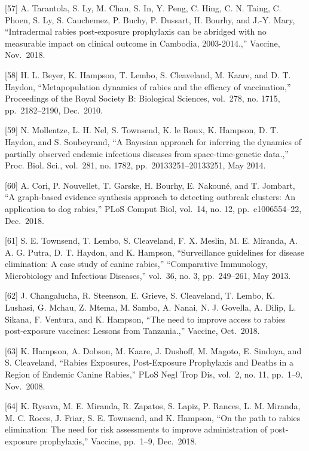 \documentclass[
]{book}
\begin{document}
{[}57{]} A. Tarantola, S. Ly, M. Chan, S. In, Y. Peng, C. Hing, C. N. Taing, C. Phoen, S. Ly, S. Cauchemez, P. Buchy, P. Dussart, H. Bourhy, and J.-Y. Mary, ``Intradermal rabies post-exposure prophylaxis can be abridged with no measurable impact on clinical outcome in Cambodia, 2003-2014.,'' Vaccine, Nov.~2018.

{[}58{]} H. L. Beyer, K. Hampson, T. Lembo, S. Cleaveland, M. Kaare, and D. T. Haydon, ``Metapopulation dynamics of rabies and the efficacy of vaccination,'' Proceedings of the Royal Society B: Biological Sciences, vol.~278, no. 1715, pp.~2182--2190, Dec.~2010.

{[}59{]} N. Mollentze, L. H. Nel, S. Townsend, K. le Roux, K. Hampson, D. T. Haydon, and S. Soubeyrand, ``A Bayesian approach for inferring the dynamics of partially observed endemic infectious diseases from space-time-genetic data.,'' Proc. Biol. Sci., vol.~281, no. 1782, pp.~20133251--20133251, May 2014.

{[}60{]} A. Cori, P. Nouvellet, T. Garske, H. Bourhy, E. Nakouné, and T. Jombart, ``A graph-based evidence synthesis approach to detecting outbreak clusters: An application to dog rabies,'' PLoS Comput Biol, vol.~14, no. 12, pp.~e1006554--22, Dec.~2018.

{[}61{]} S. E. Townsend, T. Lembo, S. Cleaveland, F. X. Meslin, M. E. Miranda, A. A. G. Putra, D. T. Haydon, and K. Hampson, ``Surveillance guidelines for disease elimination: A case study of canine rabies,'' ``Comparative Immunology, Microbiology and Infectious Diseases,'' vol.~36, no. 3, pp.~249--261, May 2013.

{[}62{]} J. Changalucha, R. Steenson, E. Grieve, S. Cleaveland, T. Lembo, K. Lushasi, G. Mchau, Z. Mtema, M. Sambo, A. Nanai, N. J. Govella, A. Dilip, L. Sikana, F. Ventura, and K. Hampson, ``The need to improve access to rabies post-exposure vaccines: Lessons from Tanzania.,'' Vaccine, Oct.~2018.

{[}63{]} K. Hampson, A. Dobson, M. Kaare, J. Dushoff, M. Magoto, E. Sindoya, and S. Cleaveland, ``Rabies Exposures, Post-Exposure Prophylaxis and Deaths in a Region of Endemic Canine Rabies,'' PLoS Negl Trop Dis, vol.~2, no. 11, pp.~1--9, Nov.~2008.

{[}64{]} K. Rysava, M. E. Miranda, R. Zapatos, S. Lapiz, P. Rances, L. M. Miranda, M. C. Roces, J. Friar, S. E. Townsend, and K. Hampson, ``On the path to rabies elimination: The need for risk assessments to improve administration of post-exposure prophylaxis,'' Vaccine, pp.~1--9, Dec.~2018.
\end{document}
